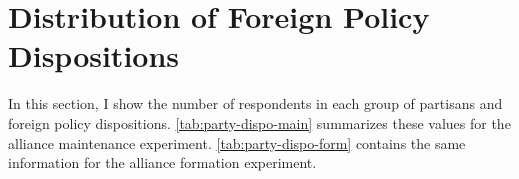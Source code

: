 \documentclass[12pt]{article}
\begin{document}
%
%
%
%
%
%
%
%
%
%


\section{Distribution of Foreign Policy Dispositions}

In this section, I show the number of respondents in each group of partisans and foreign policy dispositions. 
\autoref{tab:party-dispo-main} summarizes these values for the alliance maintenance experiment. 
\autoref{tab:party-dispo-form} contains the same information for the alliance formation experiment. 
\end{document}
